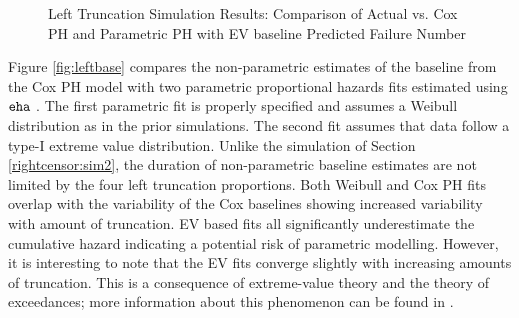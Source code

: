 \documentclass[12pt,letterpaper]{article}
\begin{document}
 \begin{figure}[h!]
 	\centering
 	\quad
 	\quad
 	\quad
 	\caption{Left Truncation Simulation Results: Comparison of Actual vs. Cox PH and Parametric PH with EV baseline Predicted Failure Number}
 	\label{fig:lefttruncation}
 \end{figure}
Figure \ref{fig:leftbase} compares the non-parametric estimates of the baseline from the Cox PH model with two parametric proportional hazards fits estimated using $\tt eha$ \citep{eha}.  The first parametric fit is properly specified and assumes a  Weibull distribution as in the prior simulations. The second fit assumes that data follow a type-I extreme value distribution.
Unlike the simulation of Section \ref{rightcensor:sim2}, the duration of non-parametric baseline estimates are not limited by the four left truncation proportions.  Both Weibull and Cox PH fits overlap with the variability of the Cox baselines showing increased variability with amount of truncation.  EV based fits all significantly underestimate the cumulative hazard indicating a potential risk of parametric modelling.  However, it is interesting to note that the EV fits converge slightly with increasing amounts of truncation.  This is a consequence of extreme-value theory and the theory of exceedances; more information about this phenomenon can be found in \citet{coles2001}.
\end{document}
